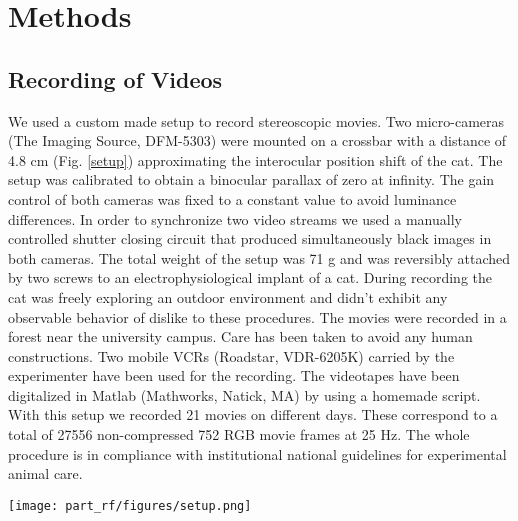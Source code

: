 \section{Methods}

\subsection{{Recording of Videos}}

We used a custom made setup to record stereoscopic movies. Two
micro-cameras (The Imaging Source, DFM-5303) were mounted on a crossbar
with a distance of 4.8 cm (Fig. \ref{setup}) approximating the interocular
position shift of the cat. The setup was calibrated to obtain a binocular
parallax of zero at infinity. The gain control of both cameras was fixed to
a constant value to avoid luminance differences. In order to synchronize
two video streams we used a manually controlled shutter closing circuit
that produced simultaneously black images in both cameras. The total weight
of the setup was 71 g and was reversibly attached by two screws to an
electrophysiological implant of a cat. During recording the cat was freely
exploring an outdoor environment and didn't exhibit any observable behavior
of dislike to these procedures. The movies were recorded in a forest near
the university campus. Care has been taken to avoid any human
constructions. Two mobile VCRs (Roadstar, VDR-6205K) carried by the
experimenter have been used for the recording. The videotapes have been
digitalized in Matlab (Mathworks, Natick, MA) by using a homemade script.
With this setup we recorded 21 movies on different days. These correspond
to a total of 27556 non-compressed 752 RGB movie frames at 25
Hz. The whole procedure is in compliance with institutional national
guidelines for experimental animal care. 

\begin{SCfigure}
\texttt{[image: part\_rf/figures/setup.png]}
\caption[Recording of Natural Movies.]{\textbf{Recording of Natural
Movies.} Natural movies were recorded at a sampling rate of 25 Hz using a
pair of analogue cameras reversibly mounted on the heads of cats. As the
cameras are positioned to have 0 binocular parallax at infinity the only
disparities presents in the input are crossed disparities. The cameras were
positioned so that the Cameras and plastic support (weight ~70 g) were
connected by cables to a pair of analogue video recorders carried by the
experimenter. Cats did not exhibit any signs of discomfort because of the
additional weight on their head, and freely explored their surroundings.
See also the Fig. \ref{basket}D} \label{setup} \end{SCfigure} 

